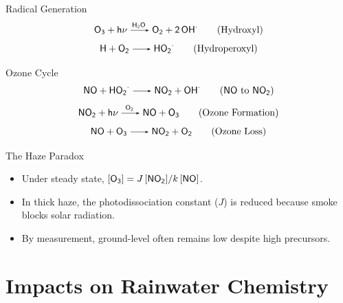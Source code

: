 \documentclass[
11pt,notheorems,hyperref={pdfauthor=whatever}
]{beamer}
\begin{document}
\begin{frame}

    \begin{block}{Radical Generation}
        \[ \ce{O3 + h$\nu$ ->[H2O] O2 + 2OH${}^\cdot$} \tag{Hydroxyl}\]
        \[ \ce{H + O2 -> HO2${}^\cdot$ }  \tag{Hydroperoxyl}\]
    \end{block}

    \begin{block}{Ozone Cycle}
        \[ \ce{NO + HO2${}^\cdot$ -> NO2 + OH${}^\cdot$} \tag{\ce{NO} to \ce{NO2}}\]
        \[ \ce{NO2 + h$\nu$ ->[O2] NO + O3} \tag{Ozone Formation}\]
        \[ \ce{NO + O3 -> NO2 + O2} \tag{Ozone Loss}\]
    \end{block}

    \begin{block}{The Haze Paradox}
        \begin{itemize}
            \item Under steady state, $[\ce{O3}] = J \,[\ce{NO2}] / k \,[\ce{NO}]$.
            \item In thick haze, the photodissociation constant ($J$) is reduced because smoke blocks solar radiation.
            \item By measurement, ground-level  often remains low despite high precursors.
        \end{itemize}
    \end{block}
\end{frame}

\section{Impacts on Rainwater Chemistry}
\end{document}
